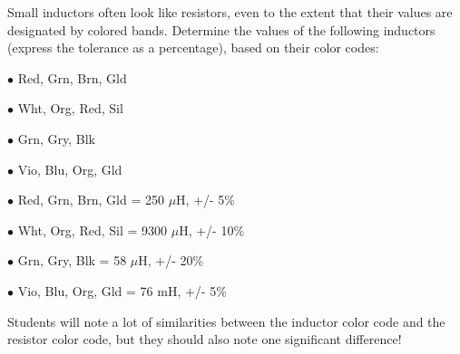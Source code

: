 

Small inductors often look like resistors, even to the extent that their values are designated by colored bands.  Determine the values of the following inductors (express the tolerance as a percentage), based on their color codes:

\medskip
\item{$\bullet$} Red, Grn, Brn, Gld
\item{$\bullet$} Wht, Org, Red, Sil
\item{$\bullet$} Grn, Gry, Blk
\item{$\bullet$} Vio, Blu, Org, Gld
\medskip







\medskip
\item{$\bullet$} Red, Grn, Brn, Gld = 250 $\mu$H, +/- 5\%
\item{$\bullet$} Wht, Org, Red, Sil = 9300 $\mu$H, +/- 10\%
\item{$\bullet$} Grn, Gry, Blk = 58 $\mu$H, +/- 20\%
\item{$\bullet$} Vio, Blu, Org, Gld = 76 mH, +/- 5\%
\medskip







Students will note a lot of similarities between the inductor color code and the resistor color code, but they should also note one significant difference!




